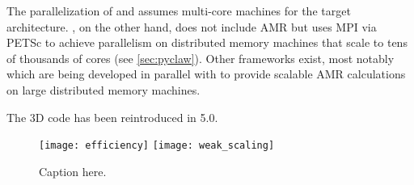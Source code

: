The parallelization of \amrclaw and \geoclaw assumes multi-core machines for the
target architecture.  \pyclaw, on the other hand, does not include AMR but uses
MPI via PETSc to achieve parallelism on distributed memory machines that scale
to tens of thousands of cores (see \cref{sec:pyclaw}). Other frameworks exist,
most notably \forestclaw \cite{Burstedde:we} which are being developed in
parallel with \amrclaw to provide scalable AMR calculations on large distributed
memory machines. 

The 3D \amrclaw code has been reintroduced in 5.0.

\begin{figure}[h]
    \centering
    \texttt{[image: efficiency]}
    \texttt{[image: weak\_scaling]}
    \caption{Caption here. }
    \label{fig:figure1}
\end{figure}
